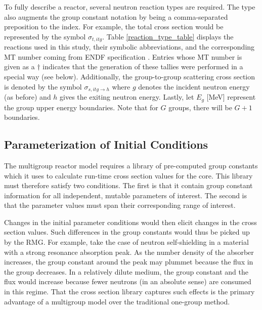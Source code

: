 To fully describe a reactor, several neutron reaction types are required.  The type 
also augments the group constant notation by being a comma-separated preposition to 
the index.  For example, the total cross section would be represented by the symbol 
$\sigma_{t,itg}$. Table \ref{reaction_type_table} displays the reactions used in this 
study, their symbolic abbreviations, and the corresponding MT number coming from ENDF 
specification \cite{MFMT}.  Entries whose MT number is given as a $\dagger$ indicates 
that the generation of these tallies were performed in a special way (see below).
Additionally, the group-to-group scattering cross section is denoted by the symbol
$\sigma_{s,itg\to h}$ where $g$ denotes the incident neutron energy (as before) and $h$
gives the exiting neutron energy.  Lastly, let $E_g$ [MeV] represent the group 
upper energy boundaries.  Note that for $G$ groups, there will be $G+1$ boundaries.

\subsection{Parameterization of Initial Conditions}
\label{mg_sec:param_ic}
The multigroup reactor model requires a library of pre-computed group constants which it uses
to calculate run-time cross section values for the core.  This library must therefore satisfy 
two conditions.  The first is that it contain group constant information for all independent, 
mutable parameters of interest.  The second is that the parameter values must span 
their corresponding range of interest.  

Changes in the initial parameter conditions would then elicit changes in the cross section 
values. Such differences in the group constants would thus be picked up by the RMG.  For example, 
take the case of neutron self-shielding in a material with a strong resonance absorption peak.  
As the number density of the absorber increases, the group constant around 
the peak may plummet because the flux in the group decreases.  In a relatively dilute medium, the group 
constant and the flux would increase because fewer neutrons (in an absolute sense) are consumed 
in this regime.  That the  cross section library captures such effects is the primary advantage 
of a multigroup model over the traditional one-group method.

